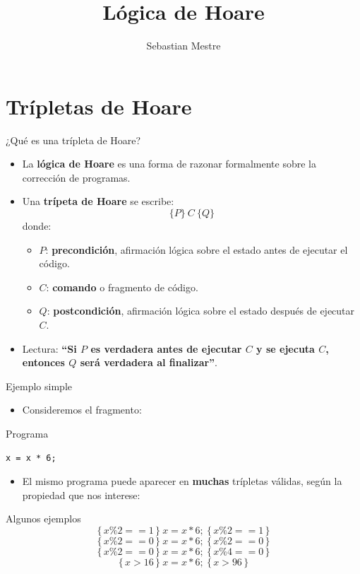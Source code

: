 \documentclass[aspectratio=169]{beamer}
\title{Lógica de Hoare}
\author{Sebastian Mestre}
\date{}
\begin{document}
\begin{frame}
  \titlepage
\end{frame}

\section{Trípletas de Hoare}

\begin{frame}{¿Qué es una trípleta de Hoare?}
  \begin{itemize}
    \item La \textbf{lógica de Hoare} es una forma de razonar formalmente sobre la corrección de programas.
    \item Una \textbf{trípeta de Hoare} se escribe:
      \[
        \{P\}\ C\ \{Q\}
      \]
      donde:
      \begin{itemize}
        \item \(P\): \textbf{precondición}, afirmación lógica sobre el estado antes de ejecutar el código.
        \item \(C\): \textbf{comando} o fragmento de código.
        \item \(Q\): \textbf{postcondición}, afirmación lógica sobre el estado después de ejecutar \(C\).
      \end{itemize}
    \item Lectura: \textbf{“Si \(P\) es verdadera antes de ejecutar \(C\) y se ejecuta \(C\), entonces \(Q\) será verdadera al finalizar”}.
  \end{itemize}
\end{frame}

\begin{frame}[fragile]{Ejemplo simple}
  \begin{itemize}
    \item Consideremos el fragmento:
  \end{itemize}
  \begin{block}{Programa}
  \begin{lstlisting}[style=customc]
x = x * 6;
  \end{lstlisting}
  \end{block}
  \begin{itemize}
    \item El mismo programa puede aparecer en \textbf{muchas} trípletas válidas, según la propiedad que nos interese:
  \end{itemize}
  \begin{block}{Algunos ejemplos}
  \[
    \{\, x \% 2 == 1 \,\}\ x = x * 6;\ \{\, x \% 2 == 1 \,\}
  \]
  \[
    \{\, x \% 2 == 0 \,\}\ x = x * 6;\ \{\, x \% 2 == 0 \,\}
  \]
  \[
    \{\, x \% 2 == 0 \,\}\ x = x * 6;\ \{\, x \% 4 == 0 \,\}
  \]
  \[
    \{\, x > 16 \,\}\ x = x * 6;\ \{\, x > 96 \,\}
  \]
  \end{block}
\end{frame}
\end{document}
